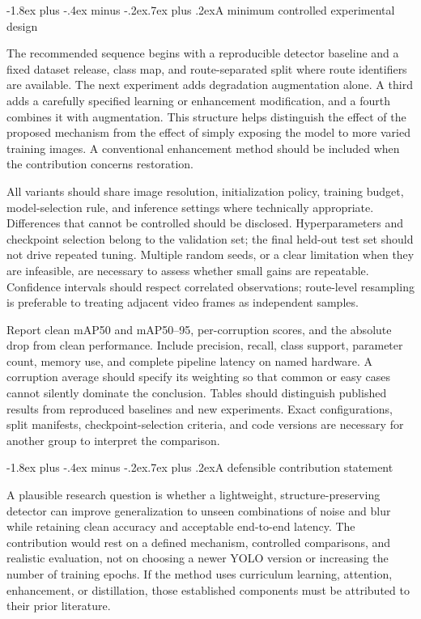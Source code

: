 \documentclass[11pt,a4paper]{article}
\makeatletter
\renewcommand\subsection{\@startsection{subsection}{2}{\z@}%
  {-1.8ex plus -.4ex minus -.2ex}{.7ex plus .2ex}{\normalfont\normalsize\bfseries}}
\makeatother
\begin{document}
\subsection{A minimum controlled experimental design}

The recommended sequence begins with a reproducible detector baseline and a fixed dataset release, class map, and route-separated split where route identifiers are available. The next experiment adds degradation augmentation alone. A third adds a carefully specified learning or enhancement modification, and a fourth combines it with augmentation. This structure helps distinguish the effect of the proposed mechanism from the effect of simply exposing the model to more varied training images. A conventional enhancement method should be included when the contribution concerns restoration.

All variants should share image resolution, initialization policy, training budget, model-selection rule, and inference settings where technically appropriate. Differences that cannot be controlled should be disclosed. Hyperparameters and checkpoint selection belong to the validation set; the final held-out test set should not drive repeated tuning. Multiple random seeds, or a clear limitation when they are infeasible, are necessary to assess whether small gains are repeatable. Confidence intervals should respect correlated observations; route-level resampling is preferable to treating adjacent video frames as independent samples.

Report clean mAP50 and mAP50--95, per-corruption scores, and the absolute drop from clean performance. Include precision, recall, class support, parameter count, memory use, and complete pipeline latency on named hardware. A corruption average should specify its weighting so that common or easy cases cannot silently dominate the conclusion. Tables should distinguish published results from reproduced baselines and new experiments. Exact configurations, split manifests, checkpoint-selection criteria, and code versions are necessary for another group to interpret the comparison.

\subsection{A defensible contribution statement}

A plausible research question is whether a lightweight, structure-preserving detector can improve generalization to unseen combinations of noise and blur while retaining clean accuracy and acceptable end-to-end latency. The contribution would rest on a defined mechanism, controlled comparisons, and realistic evaluation, not on choosing a newer YOLO version or increasing the number of training epochs. If the method uses curriculum learning, attention, enhancement, or distillation, those established components must be attributed to their prior literature.
\end{document}

